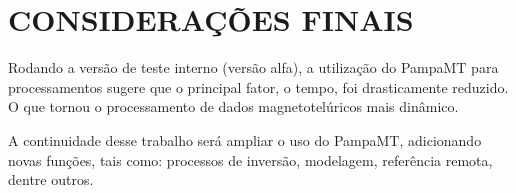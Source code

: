 \chapter{CONSIDERAÇÕES FINAIS}
    
    Rodando a versão de teste interno (versão alfa), a utilização do PampaMT para processamentos sugere que o principal fator, o tempo, foi drasticamente reduzido. O que tornou o processamento de dados magnetotelúricos mais dinâmico.
    
    A continuidade desse trabalho será ampliar o uso do PampaMT, adicionando novas funções, tais como: processos de inversão, modelagem, referência remota, dentre outros.
    
